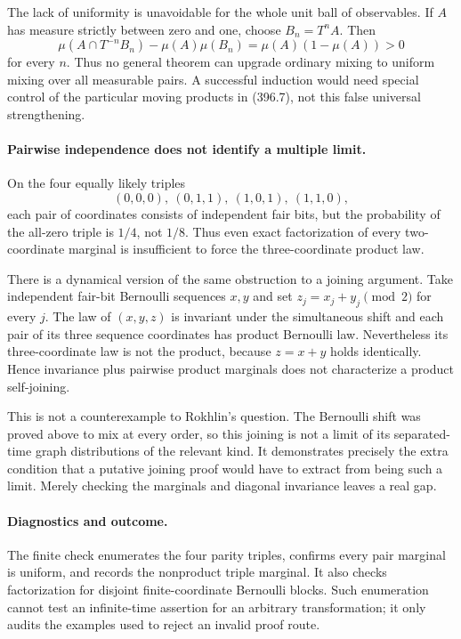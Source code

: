 \documentclass[11pt]{article}
\begin{document}
The lack of uniformity is unavoidable for the whole unit ball of
observables. If $A$ has measure strictly between zero and one, choose
$B_n=T^n A$. Then
\[
 \mu(A\cap T^{-n}B_n)-\mu(A)\mu(B_n)
       =\mu(A)(1-\mu(A))>0
\]
for every $n$. Thus no general theorem can upgrade ordinary mixing
to uniform mixing over all measurable pairs. A successful induction
would need special control of the particular moving products in
(396.7), not this false universal strengthening.

\paragraph{Pairwise independence does not identify a multiple limit.}
On the four equally likely triples
\[
 (0,0,0),\ (0,1,1),\ (1,0,1),\ (1,1,0),
\]
each pair of coordinates consists of independent fair bits, but the
probability of the all-zero triple is $1/4$, not $1/8$. Thus even
exact factorization of every two-coordinate marginal is insufficient
to force the three-coordinate product law.

There is a dynamical version of the same obstruction to a joining
argument. Take independent fair-bit Bernoulli sequences $x,y$ and
set $z_j=x_j+y_j\pmod2$ for every $j$. The law of $(x,y,z)$ is
invariant under the simultaneous shift and each pair of its three
sequence coordinates has product Bernoulli law. Nevertheless its
three-coordinate law is not the product, because $z=x+y$ holds
identically. Hence invariance plus pairwise product marginals does
not characterize a product self-joining.

This is not a counterexample to Rokhlin's question. The Bernoulli
shift was proved above to mix at every order, so this joining is
not a limit of its separated-time graph distributions of the relevant
kind. It demonstrates precisely the extra condition that a putative
joining proof would have to extract from being such a limit. Merely
checking the marginals and diagonal invariance leaves a real gap.

\paragraph{Diagnostics and outcome.}
The finite check enumerates the four parity triples, confirms every
pair marginal is uniform, and records the nonproduct triple marginal.
It also checks factorization for disjoint finite-coordinate Bernoulli
blocks. Such enumeration cannot test an infinite-time assertion for
an arbitrary transformation; it only audits the examples used to
reject an invalid proof route.
\end{document}
